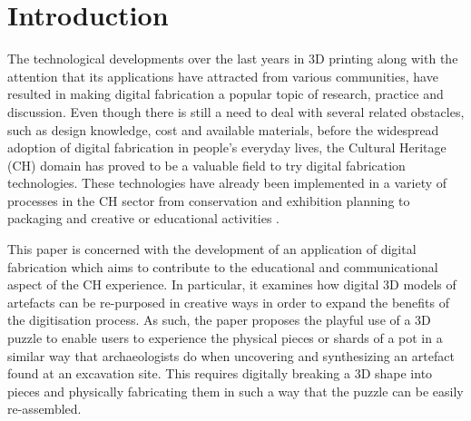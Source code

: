 \documentclass[acmlarge,screen,dvipsnames]{acmart}
\begin{document}


%





%
\maketitle




\section{Introduction}

The technological developments over the last years in 3D printing along with the
attention that its applications have attracted from various
communities, have resulted in making digital fabrication a popular
topic of research, practice and discussion. Even though there is still
a need to deal with several related obstacles, such as design
knowledge, cost and available materials, before the widespread
adoption of digital fabrication in people's everyday lives, the
Cultural Heritage (CH) domain has proved to be a valuable field to try
digital fabrication technologies. These technologies have already been
implemented in a variety of processes in the CH sector from
conservation and exhibition planning to packaging and creative or
educational activities
\cite{Neely2013,Scopigno2014,Neumuller2014,Scopigno2015}.

This paper is concerned with the development of an application of
digital fabrication which aims to contribute to the educational and
communicational aspect of the CH experience. In particular, it
examines how digital 3D models of artefacts can be re-purposed in
creative ways in order to expand the benefits of the digitisation
process. As such, the paper proposes the playful use of a 3D puzzle to
enable users to experience the physical pieces or shards of a pot in a
similar way that archaeologists do when uncovering and synthesizing an
artefact found at an excavation site. This requires digitally breaking
a 3D shape into pieces and physically fabricating them in such a way
that the puzzle can be easily re-assembled.
\end{document}
